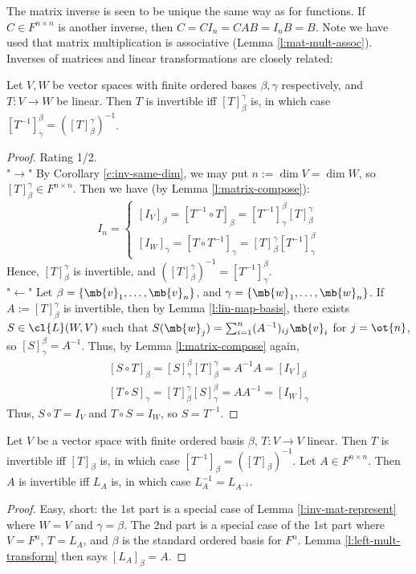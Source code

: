 The matrix inverse is seen to be unique the same way as for functions. If $C \in F^{n \times n}$ is another inverse, then $C=CI_n=CAB=I_nB=B$. Note we have used that matrix multiplication is associative (Lemma \ref{l:mat-mult-assoc}).\\
Inverses of matrices and linear transformations are closely related:
\begin{lem}\label{l:inv-mat-represent}
Let $V,W$ be vector spaces with finite ordered bases $\beta, \gamma$ respectively, and $T:V \to W$ be linear. Then $T$ is invertible iff $[T]_\beta^\gamma$ is, in which case $[T^{-1}]_\gamma^\beta= ([T]_\beta^\gamma)^{-1}$.
\end{lem}
\begin{proof}
Rating 1/2.\\
"$\to$" By Corollary \ref{c:inv-same-dim}, we may put $n:= \dim V= \dim W$, so $[T]_\beta^\gamma \in F^{n \times n}$. Then we have (by Lemma \ref{l:matrix-compose}):
\[ I_n= \begin{cases}[I_V]_\beta =[T^{-1}\circ T]_\beta =[T^{-1}]_\gamma^\beta [T]_\beta^\gamma \\
[I_W]_\gamma =[T \circ T^{-1}]_\gamma =[T]_\beta^\gamma [T^{-1}]_\gamma^\beta \end{cases}\]
Hence, $[T]_\beta^\gamma$ is invertible, and $([T]_\beta^\gamma)^{-1}=[T^{-1}]_\gamma^\beta$.\\
"$\leftarrow$" Let $\beta= \{ \mb{v}_1, \ldots, \mb{v}_n\}$, and $\gamma= \{ \mb{w}_1, \ldots, \mb{w}_n \}$. If $A:=[T]_\beta^\gamma$ is invertible, then by Lemma \ref{l:lin-map-basis}, there exists $S \in \cl{L}(W,V)$ such that $S( \mb{w}_j)= \sum_{i=1}^n(A^{-1})_{ij}\mb{v}_i$ for $j=\ot{n}$, so $[S]_\gamma^\beta=A^{-1}$. Thus, by Lemma \ref{l:matrix-compose} again,
\[ \begin{split}[S \circ T]_\beta =[S]_\gamma^\beta [T]_\beta^\gamma =A^{-1}A=[I_V]_\beta \\
[T \circ S]_\gamma =[T]_\beta^\gamma [S]_\gamma^\beta =AA^{-1}=[I_W]_\gamma
\end{split}\]
Thus, $S \circ T=I_V$ and $T \circ S=I_W$, so $S=T^{-1}$.
\end{proof}
\begin{corollary}
Let $V$ be a vector space with finite ordered basis $\beta$, $T:V \to V$ linear. Then $T$ is invertible iff $[T]_\beta$ is, in which case $[T^{-1}]_\beta =([T]_\beta)^{-1}$.
Let $A \in F^{n \times n}$. Then $A$ is invertible iff $L_A$ is, in which case $L_A^{-1}=L_{A^{-1}}$.
\end{corollary}
\begin{proof}
Easy, short: the 1st part is a special case of Lemma \ref{l:inv-mat-represent} where $W=V$ and $\gamma= \beta$. The 2nd part is a special case of the 1st part where $V=F^n$, $T=L_A$, and $\beta$ is the standard ordered basis for $F^n$. Lemma \ref{l:left-mult-transform} then says $[L_A]_\beta =A$.
\end{proof}
